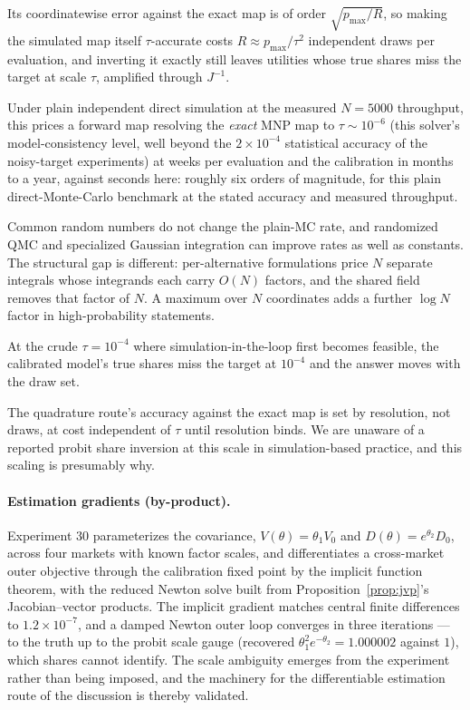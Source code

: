 \documentclass[12pt]{article}
\theoremstyle{remark}
\begin{document}
Its coordinatewise error against the exact map is of order
$\sqrt{p_{\max}/R}$, so making the simulated map itself $\tau$-accurate
costs $R \approx p_{\max}/\tau^2$ independent draws per evaluation, and
inverting it exactly still leaves utilities whose true shares miss the
target at scale $\tau$, amplified through $J^{-1}$.

Under plain
independent direct simulation at the measured $N = 5000$ throughput, this
prices a forward map resolving the \emph{exact} MNP map to $\tau \sim
10^{-6}$ (this solver's model-consistency level, well beyond the
$2\times10^{-4}$ statistical accuracy of the noisy-target experiments) at
weeks per evaluation and the calibration in months to a year,
against seconds here: roughly six orders of magnitude, for this plain
direct-Monte-Carlo benchmark at the stated accuracy and measured
throughput.

Common
random numbers do not change the plain-MC rate, and randomized QMC and
specialized Gaussian integration can improve rates as well as
constants. The structural gap is different: per-alternative
formulations price $N$ separate integrals whose integrands each carry
$O(N)$ factors, and the shared field removes that factor of $N$. A
maximum over $N$ coordinates adds a further $\log N$ factor in
high-probability statements.

At the crude $\tau = 10^{-4}$ where
simulation-in-the-loop first becomes feasible, the calibrated model's true
shares miss the target at $10^{-4}$ and the answer moves with the draw
set.

The quadrature route's accuracy against the exact map is set by
resolution, not draws, at cost independent of $\tau$ until resolution
binds. We are unaware of a reported
probit share inversion at this scale in simulation-based practice, and this
scaling is presumably why.

\paragraph{Estimation gradients (by-product).} Experiment 30
parameterizes the covariance, $V(\theta) = \theta_1 V_0$ and
$D(\theta) = e^{\theta_2} D_0$, across four markets with known factor
scales, and differentiates a cross-market outer objective through the
calibration fixed point by the implicit function theorem, with the
reduced Newton solve built from Proposition~\ref{prop:jvp}'s
Jacobian--vector products. The implicit gradient matches central finite
differences to $1.2\times10^{-7}$, and a damped Newton outer loop
converges in three iterations --- to the truth up to the probit scale
gauge (recovered $\theta_1^2 e^{-\theta_2} = 1.000002$ against $1$),
which shares cannot identify. The scale ambiguity emerges from the
experiment rather than being imposed, and the machinery for the
differentiable estimation route of the discussion is thereby validated.
\end{document}
